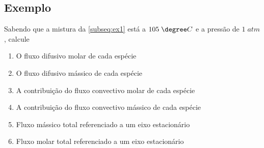 \subsection{Exemplo}
Sabendo que a mistura da \ref{subseq:ex1} está a \(105 \; \degree C\) e a pressão de \(1 \; atm\),
calcule 
\begin{enumerate}
    \item O fluxo difusivo molar de cada espécie \label{item:ex4_q1}
    \item O fluxo difusivo mássico de cada espécie \label{item:ex4_q2}
    \item A contribuição do fluxo convectivo molar de cada espécie \label{item:ex4_q3}
    \item A contribuição do fluxo convectivo mássico de cada espécie \label{item:ex4_q4}
    \item Fluxo mássico total referenciado a um eixo estacionário \label{item:ex4_q5}
    \item Fluxo molar total referenciado a um eixo estacionário \label{item:ex4_q6}
\end{enumerate}

